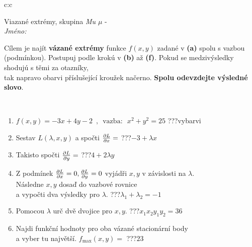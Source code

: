 \documentclass[10pt]{report}
\begin{document}
\begin{tabular}{c:c}
\begin{minipage}[c][104.5mm][t]{0.5\linewidth}
\begin{center}
\vspace{7mm}
{\huge Viazané extrémy, skupina \textit{Mu $\mu$} -}\\[5mm]
\textit{Jméno:}\phantom{xxxxxxxxxxxxxxxxxxxxxxxxxxxxxxxxxxxxxxxxxxxxxxxxxxxxxxxxxxxxxxxxx}\\[5mm]
\begin{minipage}{0.95\linewidth}
\begin{center}
Cílem je najít \textbf{vázané extrémy} funkce $f(x,y)$ zadané v \textbf{(a)} spolu s vazbou (podmínkou). Postupuj podle krokú v \textbf{(b)} až \textbf{(f)}. Pokud se medzivýsledky shodujú s těmi za otazníky,\\tak napravo obarvi příslušející kroužek načerno. \textbf{Spolu odevzdejte výsledné slovo}.
\end{center}
\end{minipage}
\\[1mm]
\begin{minipage}{0.79\linewidth}
\begin{center}
\begin{varwidth}{\linewidth}
\begin{enumerate}
\normalsize
\item $f(x,y)=-3x+4y-2 \enspace , \enspace \mathrm{vazba:} \enspace x^2+y^2=25$\quad \dotfill\; ???\;\dotfill \quad vybarvi
\item Sestav $L(\lambda,x,y)$ a spočti $\pdv{L}{x}=$\quad \dotfill\; ???\;\dotfill \quad $-3+\lambda x$
\item Takisto spočti $\pdv{L}{y}=$\quad \dotfill\; ???\;\dotfill \quad $4+2\lambda y$
\item Z podmínek $\pdv{L}{x}=0 , \pdv{L}{y}=0$ vyjádři $x,y$ v závislosti na $\lambda$.\\ \phantom{xxxxxx}Následne $x,y$ dosaď do vazbové rovnice\\ \phantom{xxxxxx}a vypočti dva výsledky pro $\lambda$.\quad \dotfill\; ???\;\dotfill \quad $\lambda_1+\lambda_2=-1$
\item Pomocou $\lambda$ urč dvě dvojice pro $x,y$.\quad \dotfill\; ???\;\dotfill \quad $x_1 x_2 y_1 y_2=36$
\item Najdi funkční hodnoty pro oba vázané stacionární body\\ \phantom{xxxxxx}a vyber tu najvětší. $f_{\text{max}}(x,y)=$\quad \dotfill\; ???\;\dotfill \quad $23$

\end{enumerate}
\end{varwidth}
\end{center}
\end{minipage}
\end{center}
\end{minipage}
\end{tabular}
\end{document}
